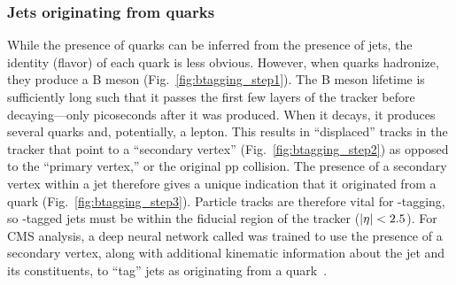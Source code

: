 \subsubsection{Jets originating from \Pb quarks}
While the presence of quarks can be inferred from the presence of jets, the identity (flavor) of each quark is less obvious. 
However, when \Pb quarks hadronize, they produce a B meson (Fig.~\ref{fig:btagging_step1}). 
The B meson lifetime is sufficiently long such that it passes the first few layers of the tracker before decaying---only picoseconds after it was produced. 
When it decays, it produces several quarks and, potentially, a lepton. 
This results in ``displaced'' tracks in the tracker that point to a ``secondary vertex'' (Fig.~\ref{fig:btagging_step2}) as opposed to the ``primary vertex,'' or the original pp collision. 
The presence of a secondary vertex within a jet therefore gives a unique indication that it originated from a \Pb quark (Fig.~\ref{fig:btagging_step3}). 
Particle tracks are therefore vital for \Pb-tagging, so \Pb-tagged jets must be within the fiducial region of the tracker ($\lvert \eta \rvert < 2.5$). 
For CMS analysis, a deep neural network called \DeepJet was trained to use the presence of a secondary vertex, along with additional kinematic information about the jet and its constituents, to ``tag'' jets as originating from a \Pb quark~\cite{Bols:2020bkb}. 

